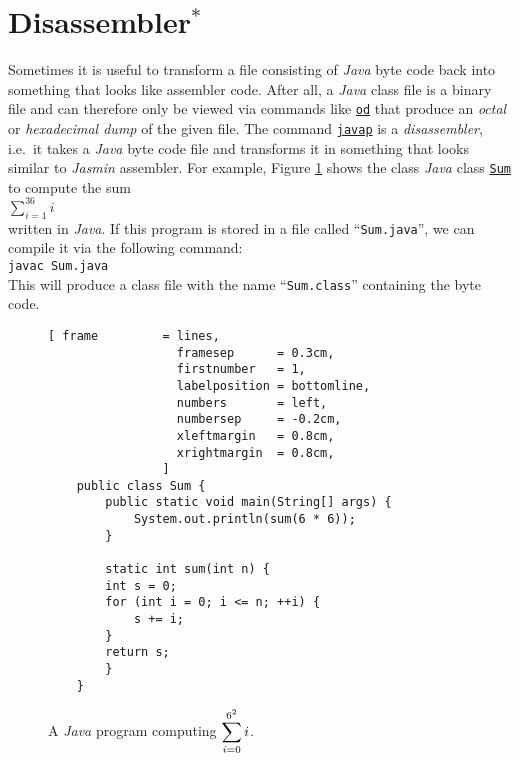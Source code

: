 \section{Disassembler$^*$}
Sometimes it is useful to transform a file consisting of \textsl{Java} byte code back into something
that looks like assembler code.  After all, a \textsl{Java} class file is a binary file and can
therefore only be viewed via commands like \href{http://en.wikipedia.org/wiki/Od_(Unix)}{\texttt{od}} 
that produce an \emph{octal} or \emph{hexadecimal dump} of the given file.  The command
\href{http://docs.oracle.com/javase/7/docs/technotes/tools/windows/javap.html}{\texttt{javap}} 
is a \emph{disassembler},  i.e.~it takes a \textsl{Java} byte code file and transforms it in
something that looks similar to \textsl{Jasmin} assembler.  For example, Figure \ref{fig:Sum.java}
shows the class \textsl{Java} class
\href{https://github.com/karlstroetmann/Formal-Languages/tree/master/Jasmin/Sum.java}{\texttt{Sum}}
 to compute the sum 
\\[0.2cm]
\hspace*{1.3cm}
$\sum\limits_{i=1}^{36} i$
\\[0.2cm]
written in \textsl{Java}.  If this program is
stored in a file called ``\texttt{Sum.java}'', we can compile it via the following command:
\\[0.2cm]
\hspace*{1.3cm}
\texttt{javac Sum.java}
\\[0.2cm]
This will produce a class file with the name ``\texttt{Sum.class}'' containing the byte code.

\begin{figure}[!ht]
\centering
\begin{Verbatim}[ frame         = lines, 
                  framesep      = 0.3cm, 
                  firstnumber   = 1,
                  labelposition = bottomline,
                  numbers       = left,
                  numbersep     = -0.2cm,
                  xleftmargin   = 0.8cm,
                  xrightmargin  = 0.8cm,
                ]
    public class Sum {
        public static void main(String[] args) {
            System.out.println(sum(6 * 6));
        }
    
        static int sum(int n) {
    	int s = 0;
    	for (int i = 0; i <= n; ++i) {
    	    s += i;
    	}
    	return s;
        }
    }
\end{Verbatim}
\vspace*{-0.3cm}
\caption{A \textsl{Java} program computing $\displaystyle\sum\limits_{i=0}^{6^2} i$.}
\label{fig:Sum.java}
\end{figure}

